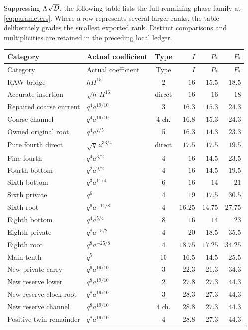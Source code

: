 \documentclass[11pt]{article}
\numberwithin{equation}{section}
\theoremstyle{remark}\newtheorem{remark}[theorem]{Remark}
\begin{document}
Suppressing $\Lambda\sqrt D$, the following table lists the full remaining phase family at \eqref{eq:parameters}. Where a row represents several larger ranks, the table deliberately grades the smallest exported rank. Distinct comparisons and multiplicities are retained in the preceding local ledger.
\begin{longtable}{@{}p{}lcrrr@{}}
\toprule
Category & Actual coefficient & Type & $I$ & $P_*$ & $F_*$\\
\midrule\endfirsthead
\toprule
Category & Actual coefficient & Type & $I$ & $P_*$ & $F_*$\\
\midrule\endhead
RAW bridge & $hH^{15}$ & 2 & $16$ & $15.5$ & $18.5$\\[3pt]
Accurate insertion & $\sqrt h\,H^{16}$ & direct & $16$ & $16$ & $18$\\[3pt]
Repaired coarse current & $q^4a^{19/10}$ & 3 & $16.3$ & $15.3$ & $24.3$\\[3pt]
Coarse channel & $q^4a^{19/10}$ & $4$ ch. & $16.8$ & $15.3$ & $24.3$\\[3pt]
Owned original root & $q^4a^{7/5}$ & 5 & $16.3$ & $14.3$ & $23.3$\\[3pt]
Pure fourth direct & $\sqrt q\,a^{33/4}$ & direct & $17.5$ & $17.5$ & $19.5$\\[3pt]
Fine fourth & $q^4a^{3/2}$ & 4 & $16$ & $14.5$ & $23.5$\\[3pt]
Fourth bottom & $q^2a^{9/2}$ & 4 & $16$ & $14.5$ & $19.5$\\[3pt]
Sixth bottom & $q^3a^{11/4}$ & 6 & $16$ & $14$ & $21$\\[3pt]
Sixth private & $q^6$ & 4 & $19$ & $17.5$ & $30.5$\\[3pt]
Sixth root & $q^6a^{-11/8}$ & 4 & $16.25$ & $14.75$ & $27.75$\\[3pt]
Eighth bottom & $q^4a^{5/4}$ & 8 & $16$ & $14$ & $23$\\[3pt]
Eighth private & $q^8a^{-5/2}$ & 4 & $20$ & $18.5$ & $35.5$\\[3pt]
Eighth root & $q^8a^{-25/8}$ & 4 & $18.75$ & $17.25$ & $34.25$\\[3pt]
Main tenth & $q^5$ & 10 & $16.5$ & $14.5$ & $25.5$\\[3pt]
New private carry & $q^6a^{19/10}$ & 3 & $22.3$ & $21.3$ & $34.3$\\[3pt]
New reserve lower & $q^8a^{19/10}$ & 2 & $27.8$ & $27.3$ & $44.3$\\[3pt]
New reserve clock root & $q^8a^{19/10}$ & 3 & $28.3$ & $27.3$ & $44.3$\\[3pt]
New reserve channel & $q^8a^{19/10}$ & $4$ ch. & $28.8$ & $27.3$ & $44.3$\\[3pt]
Positive twin remainder & $q^8a^{19/10}$ & 4 & $28.8$ & $27.3$ & $44.3$\\[3pt]
\bottomrule
\end{longtable}
\end{document}
